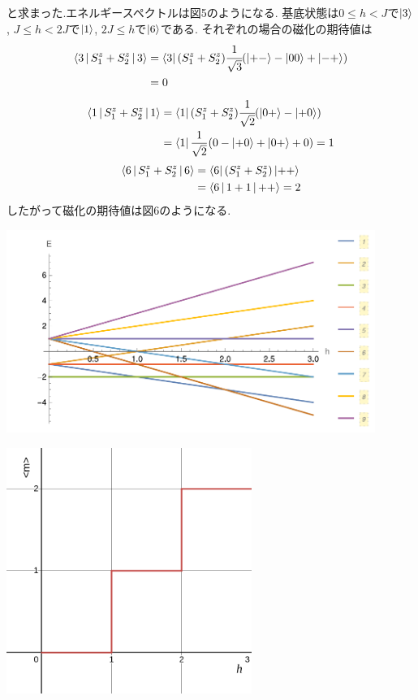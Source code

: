 \documentclass[uplatex,a4j,11pt,dvipdfmx]{jsarticle}
\makeatletter
\def\fgcaption{\def\@captype{figure}\caption}
\def\fgcaption{\def\@captype{figure}\caption}
\makeatother
\begin{document}
と求まった.エネルギースペクトルは図5のようになる.
基底状態は$0\leq h<J$で$\Ket{3}$, $J\leq h<2J$で$\Ket{1}$, $2J\leq h$で$\Ket{6}$である.
それぞれの場合の磁化の期待値は
\begin{align}
  \begin{split}
    \Braket{3|S_1^z+S_2^z|3}&=\Bra{3}(S_1^z+S_2^z)\cfrac{1}{\sqrt{3}}(\Ket{+-}-\Ket{00}+\Ket{-+})\\
    &=0
  \end{split}
\end{align}
\begin{align}
  \begin{split}
    \Braket{1|S_1^z+S_2^z|1}&=\Bra{1}(S_1^z+S_2^z)\cfrac{1}{\sqrt{2}}(\Ket{0+}-\Ket{+0})\\
    &=\Bra{1}\frac{1}{\sqrt{2}}(0-\Ket{+0}+\Ket{0+}+0)=1
  \end{split}
\end{align}
\begin{align}
  \begin{split}
    \Braket{6|S_1^z+S_2^z|6}&=\Bra{6}(S_1^z+S_2^z)\Ket{++}\\
    &=\Braket{6|1+1|++}=2
  \end{split}
\end{align}
したがって磁化の期待値は図6のようになる.
\begin{center}
  \includegraphics[width=12cm]{espec.pdf}
  \fgcaption{エネルギースペクトル($J=1$の場合)}
\end{center}
\begin{center}
  \includegraphics[width=8cm]{mmean_s1.png}
  \fgcaption{磁化の期待値($J=1$の場合, Desmosで描画)}
\end{center}
\end{document}
